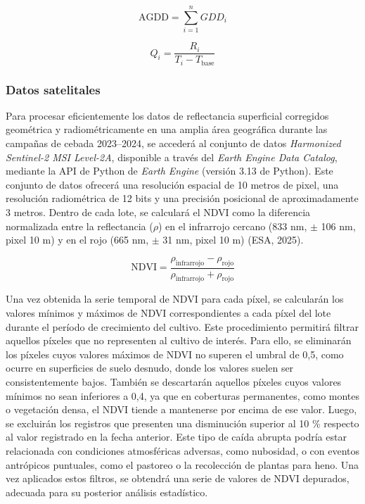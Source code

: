 \documentclass[
11pt, %
]{charter}
\begin{document}
\begin{equation}
\label{eq:AGDD}
\text{AGDD} = \sum_{i=1}^{n} GDD_{i}
\end{equation}

\begin{equation}
\label{eq:Q}
Q_i = \frac{R_i}{T_i - T_{\text{base}}}
\end{equation}


\subsubsection{Datos satelitales}
\label{sec:descripcion}

Para procesar eficientemente los datos de reflectancia superficial corregidos geométrica y radiométricamente en una amplia área geográfica durante las campañas de cebada 2023–2024, se accederá al conjunto de datos \textit{Harmonized Sentinel-2 MSI Level-2A}, disponible a través del \textit{Earth Engine Data Catalog}, mediante la API de Python de \textit{Earth Engine} (versión 3.13 de Python). Este conjunto de datos ofrecerá una resolución espacial de 10 metros de pixel, una resolución radiométrica de 12 bits y una precisión posicional de aproximadamente 3 metros. Dentro de cada lote, se calculará el NDVI  como
la diferencia normalizada entre la reflectancia ($\rho$) en el infrarrojo cercano (833 nm, $\pm$ 106 nm, pixel 10 m) y en el rojo (665 nm, $\pm$ 31 nm, pixel 10 m) (ESA, 2025). 

\begin{equation}
\text{NDVI} = \frac{\rho_{\text{infrarrojo}} - \rho_{\text{rojo}}}{\rho_{\text{infrarrojo}} + \rho_{\text{rojo}}} \label{eq:ndvi_def}
\end{equation}

Una vez obtenida la serie temporal de NDVI para cada píxel, se calcularán los valores mínimos y máximos de NDVI correspondientes a cada píxel del lote durante el período de crecimiento del cultivo. Este procedimiento permitirá filtrar aquellos píxeles que no representen al cultivo de interés. Para ello, se eliminarán los píxeles cuyos valores máximos de NDVI no superen el umbral de 0,5, como ocurre en superficies de suelo desnudo, donde los valores suelen ser consistentemente bajos. También se descartarán aquellos píxeles cuyos valores mínimos no sean inferiores a 0,4, ya que en coberturas permanentes, como montes o vegetación densa, el NDVI tiende a mantenerse por encima de ese valor. Luego, se excluirán los registros que presenten una disminución superior al 10 \% respecto al valor registrado en la fecha anterior. Este tipo de caída abrupta podría estar relacionada con condiciones atmosféricas adversas, como nubosidad, o con eventos antrópicos puntuales, como el pastoreo o la recolección de plantas para heno. Una vez aplicados estos filtros, se obtendrá una serie de valores de NDVI depurados, adecuada para su posterior análisis estadístico.
\end{document}
